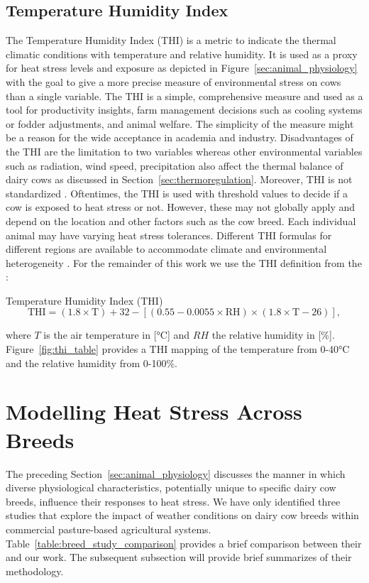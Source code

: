 \subsection{Temperature Humidity Index}
The Temperature Humidity Index (THI) is a metric to indicate the thermal climatic conditions with temperature and relative humidity. It is used as a proxy for heat stress levels and exposure as depicted in Figure~\ref{sec:animal_physiology} with the goal to give a more precise measure of environmental stress on cows than a single variable. The THI is a simple, comprehensive measure and used as a tool for productivity insights, farm management decisions such as cooling systems or fodder adjustments, and animal welfare. The simplicity of the measure might be a reason for the wide acceptance in academia and industry. Disadvantages of the THI are the limitation to two variables whereas other environmental variables such as radiation, wind speed, precipitation also affect the thermal balance of dairy cows as discussed in Section~\ref{sec:thermoregulation}. Moreover, THI is not standardized \citep{moore_how_2023}. Oftentimes, the THI is used with threshold values to decide if a cow is exposed to heat stress or not. However, these may not globally apply and depend on the location and other factors such as the cow breed. Each individual animal may have varying heat stress tolerances. Different THI formulas for different regions are available to accommodate climate and environmental heterogeneity \citep{bohmanova_temperature-humidity_2007}. For the remainder of this work we use the THI definition from the \cite{nrc_1971}:
\begin{defi} Temperature Humidity Index (THI)
\begin{equation}
    \text{THI} = (1.8 \times \text{T}) + 32 - \left[ (0.55 - 0.0055 \times \text{RH}) \times (1.8 \times \text{T} - 26) \right],
\end{equation}
\end{defi}
where $T$ is the air temperature in [°C] and $RH$ the relative humidity in [\%].  Figure~\ref{fig:thi_table} provides a THI mapping of the temperature from 0-40°C and the relative humidity from 0-100\%.

\section{Modelling Heat Stress Across Breeds}\label{sec:breed_models}
The preceding Section~\ref{sec:animal_physiology} discusses the manner in which diverse physiological characteristics, potentially unique to specific dairy cow breeds, influence their responses to heat stress. We have only identified three studies that explore the impact of weather conditions on dairy cow breeds within commercial pasture-based agricultural systems. Table~\ref{table:breed_study_comparison} provides a brief comparison between their and our work. The subsequent subsection will provide brief summarizes of their methodology.

